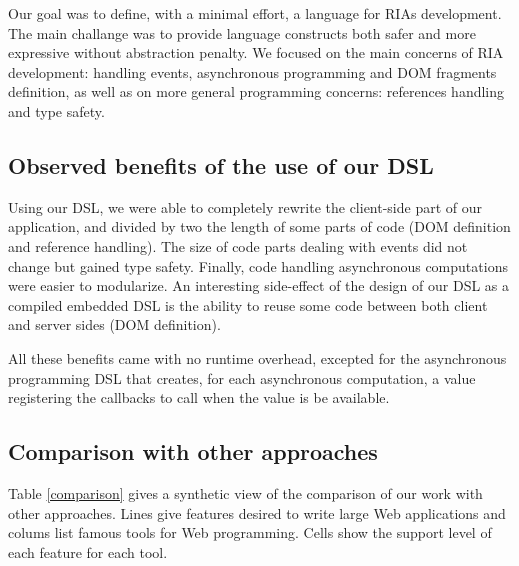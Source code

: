 \documentclass[american,english,runningheads]{llncs}
\begin{document}
Our goal was to define, with a minimal effort, a language for RIAs development. The main challange was to provide
language constructs both safer and more expressive without abstraction penalty. We focused on the main concerns of
RIA development: handling events, asynchronous programming and DOM fragments definition, as well as on more general
programming concerns:  references handling and type safety.

\subsection{Observed benefits of the use of our DSL}

Using our DSL, we were able to completely rewrite the client-side part of our application, and divided by two the
length of some parts of code (DOM definition and  reference handling). The size of code parts dealing with
events did not change but gained type safety. Finally, code handling asynchronous computations were easier to
modularize. An interesting side-effect of the design of our DSL as a compiled embedded DSL is the ability to reuse
some code between both client and server sides (DOM definition).

All these benefits came with no runtime overhead, excepted for the asynchronous programming DSL that creates, for
each asynchronous computation, a  value registering the callbacks to call when the value is be
available.

\subsection{Comparison with other approaches}

Table \ref{comparison} gives a synthetic view of the comparison of our work with other approaches. Lines give
features desired to write large Web applications and colums list famous tools for Web programming. Cells show the
support level of each feature for each tool.
\end{document}
